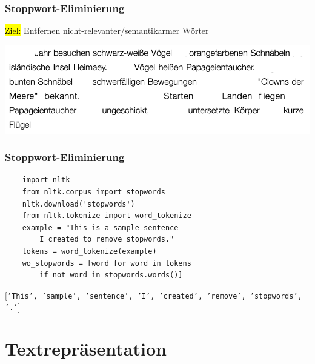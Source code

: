 \begin{frame}
    \frametitle{Stoppwort-Eliminierung}

    \hl{Ziel:} Entfernen nicht-relevanter/semantikarmer Wörter

    \centering\includegraphics[width=\textwidth]{fig8/stopwords_example2}

\end{frame}
     

\begin{frame}[fragile]
    \frametitle{Stoppwort-Eliminierung}

\begin{verbatim}
    import nltk
    from nltk.corpus import stopwords
    nltk.download('stopwords')
    from nltk.tokenize import word_tokenize
    example = "This is a sample sentence 
        I created to remove stopwords."
    tokens = word_tokenize(example)
    wo_stopwords = [word for word in tokens 
        if not word in stopwords.words()]
    \end{verbatim}

    \texttt{$[$'This', 'sample', 'sentence', 'I', 'created', 'remove', 'stopwords', '.'$]$}
    
\end{frame}


\section{Textrepräsentation}

